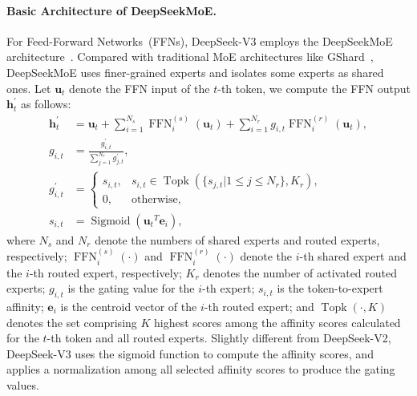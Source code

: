 \documentclass[11pt, a4paper, logo, copyright, nonumbering]{deepseek}
\newcommand{\dsvii}{DeepSeek-V2}
\newcommand{\dsmoe}{DeepSeekMoE}
\newcommand{\dsviii}{DeepSeek-V3}
\begin{document}
\begin{CJK*}{UTF8}{gbsn}
\paragraph{Basic Architecture of \dsmoe{}.}
For Feed-Forward Networks~(FFNs), \dsviii{} employs the \dsmoe{} architecture~\citep{deepseekmoe}. 
Compared with traditional MoE architectures like GShard~\citep{gshard}, \dsmoe{} uses finer-grained experts and isolates some experts as shared ones.
Let $\mathbf{u}_{t}$ denote the FFN input of the $t$-th token, we compute the FFN output $\mathbf{h}_{t}^{\prime}$ as follows:
\begin{align}
    \mathbf{h}_{t}^{\prime} & = \mathbf{u}_{t} + \sum_{i=1}^{N_{s}} {\operatorname{FFN}^{(s)}_{i}\left( \mathbf{u}_{t} \right)} + \sum_{i=1}^{N_r} {g_{i,t} \operatorname{FFN}^{(r)}_{i}\left( \mathbf{u}_{t} \right)}, \\
    g_{i,t} & = \frac{g^{\prime}_{i,t}}{\sum_{j=1}^{N_r} g^{\prime}_{j,t}}, \\
    g^{\prime}_{i,t} & = \begin{cases} 
    s_{i,t}, & s_{i,t} \in \operatorname{Topk} (\{ s_{j, t} | 1 \leq j \leq N_r \}, K_{r}), \\
    0, & \text{otherwise}, 
    \end{cases} \\
    s_{i,t} & = \operatorname{Sigmoid} \left( {\mathbf{u}_{t}}^{T} \mathbf{e}_{i} \right),
\end{align}
where $N_{s}$ and $N_r$ denote the numbers of shared experts and routed experts, respectively; 
$\operatorname{FFN}^{(s)}_{i}(\cdot)$ and $\operatorname{FFN}^{(r)}_{i}(\cdot)$ denote the $i$-th shared expert and the $i$-th routed expert, respectively; 
$K_{r}$ denotes the number of activated routed experts; 
$g_{i,t}$ is the gating value for the $i$-th expert; 
$s_{i,t}$ is the token-to-expert affinity; 
$\mathbf{e}_{i}$ is the centroid vector of the $i$-th routed expert; 
and $\operatorname{Topk}(\cdot, K)$ denotes the set comprising $K$ highest scores among the affinity scores calculated for the $t$-th token and all routed experts.
Slightly different from \dsvii{}, \dsviii{} uses the sigmoid function to compute the affinity scores, and applies a normalization among all selected affinity scores to produce the gating values. 


\end{CJK*}
\end{document}

